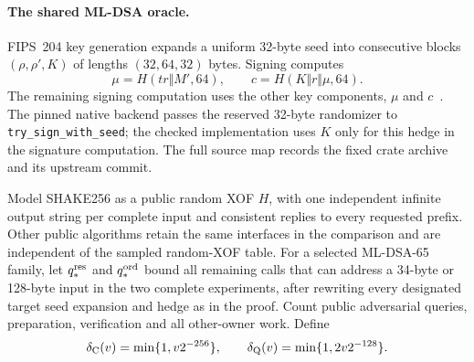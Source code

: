 \paragraph{The shared ML-DSA oracle.}
FIPS~204 key generation expands a uniform 32-byte seed into consecutive
blocks $(\rho,\rho',K)$ of lengths $(32,64,32)$ bytes. Signing computes
\[
 \mu=H(\mathit{tr}\Vert M',64),\qquad
 c=H(K\Vert r\Vert\mu,64).
\]
The remaining signing computation uses the other key components, $\mu$
and $c$~\cite{fips204}. The pinned native backend passes the reserved
32-byte randomizer to \texttt{try\_sign\_with\_seed}; the checked implementation
uses $K$ only for this hedge in the signature computation. The full source
map records the fixed crate archive and its upstream commit.

Model SHAKE256 as a public random XOF $H$, with one independent infinite
output string per complete input and consistent replies to every requested
prefix. Other public algorithms retain the same interfaces in the
comparison and are independent of the sampled random-XOF table. For a
selected ML-DSA-65 family, let $q_*^{\rm res}$ and
$q_*^{\rm ord}$ bound all remaining calls that can address a 34-byte or
128-byte input in the two complete experiments, after rewriting every
designated target seed expansion and hedge as in the proof. Count public
adversarial queries, preparation, verification and all other-owner work.
Define
\[
 \delta_{\rm C}(v)=\min\{1,v2^{-256}\},\qquad
 \delta_{\rm Q}(v)=\min\{1,2v2^{-128}\}.
\]

